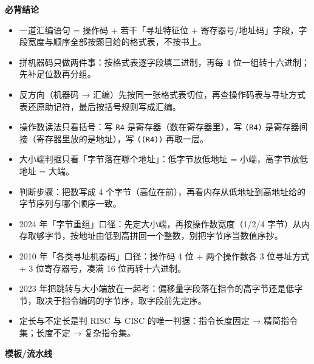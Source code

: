 \documentclass[10pt,a4paper]{ctexart}
\begin{document}



\textbf{必背结论}

\begin{itemize}

\item 一道汇编语句 = 操作码 + 若干「寻址特征位 + 寄存器号/地址码」字段，字段宽度与顺序全部按题目给的格式表，不按书上。

\item 拼机器码只做两件事：按格式表逐字段填二进制，再每 4 位一组转十六进制；先补足位数再分组。

\item 反方向（机器码 → 汇编）先按同一张格式表切位，再查操作码表与寻址方式表还原助记符，最后按括号规则写成汇编。

\item 操作数读法只看括号：写 \texttt{R4} 是寄存器（数在寄存器里），写 \texttt{(R4)} 是寄存器间接（寄存器里放的是地址），写 \texttt{((R4))} 再取一层。

\item 大小端判据只看「字节落在哪个地址」：低字节放低地址 = 小端，高字节放低地址 = 大端。

\item 判断步骤：把数写成 4 个字节（高位在前），再看内存从低地址到高地址给的字节序列与哪个顺序一致。

\item 2024 年「字节重组」口径：先定大小端，再按操作数宽度（1/2/4 字节）从内存取够字节，按地址由低到高拼回一个整数，别把字节序当数值序抄。

\item 2010 年「各类寻址机器码」口径：操作码 4 位 + 两个操作数各 3 位寻址方式 + 3 位寄存器号，凑满 16 位再转十六进制。

\item 2023 年把跳转与大小端放在一起考：偏移量字段落在指令的高字节还是低字节，取决于指令编码的字节序，取字段前先定序。

\item 定长与不定长是判 RISC 与 CISC 的唯一判据：指令长度固定 → 精简指令集；长度不定 → 复杂指令集。

\end{itemize}

\textbf{模板/流水线}
\end{document}

